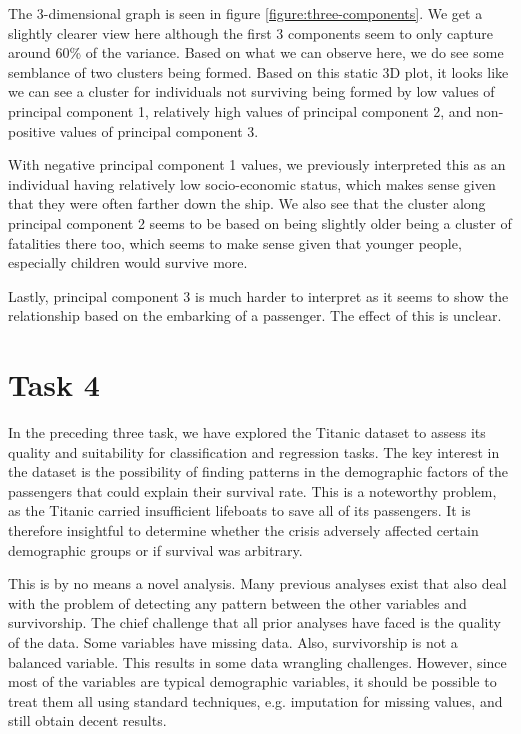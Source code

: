 \documentclass[twoside,11pt]{article}
\begin{document}
The 3-dimensional graph is seen in figure \ref{figure:three-components}. We get a slightly clearer view here although the first 3 components seem to only capture around 60\% of the variance. Based on what we can observe here, we do see some semblance of two clusters being formed. Based on this static 3D plot, it looks like we can see a cluster for individuals not surviving being formed by low values of principal component 1, relatively high values of principal component 2, and non-positive values of principal component 3.

With negative principal component 1 values, we previously interpreted this as an individual having relatively low socio-economic status, which makes sense given that they were often farther down the ship. We also see that the cluster along principal component 2 seems to be based on being slightly older being a cluster of fatalities there too, which seems to make sense given that younger people, especially children would survive more.

Lastly, principal component 3 is much harder to interpret as it seems to show the relationship based on the embarking of a passenger. The effect of this is unclear.

\section*{Task 4}

In the preceding three task, we have explored the Titanic dataset to assess its quality and suitability for classification and regression tasks. The key interest in the dataset is the possibility of finding patterns in the demographic factors of the passengers that could explain their survival rate. This is a noteworthy problem, as the Titanic carried insufficient lifeboats to save all of its passengers. It is therefore insightful to determine whether the crisis adversely affected certain demographic groups or if survival was arbitrary.

This is by no means a novel analysis. Many previous analyses exist that also deal with the problem of detecting any pattern between the other variables and survivorship. The chief challenge that all prior analyses have faced is the quality of the data. Some variables have missing data. Also, survivorship is not a balanced variable. This results in some data wrangling challenges. However, since most of the variables are typical demographic variables, it should be possible to treat them all using standard techniques, e.g. imputation for missing values, and still obtain decent results.
\end{document}
